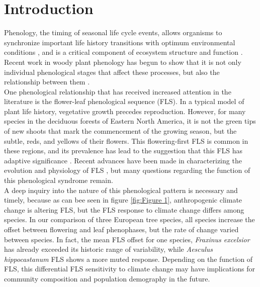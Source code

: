 \documentclass[12pt]{article}\usepackage[]{graphicx}\usepackage[]{color}
\begin{document}
\section*{Introduction}
\indent \indent Phenology, the timing of seasonal life cycle events, allows organisms to synchronize important life history transitions with optimum environmental conditions \citep{Forrest2010}, and is a critical component of ecosystem structure and function \citep{Cleland2007,Piao2007}. Recent work in woody plant phenology has begun to show that it is not only individual phenological stages that affect these processes, but also the relationship between them \citep{Ettinger2018}.\\
\indent One phenological relationship that has received increased attention in the literature is the flower-leaf phenological sequence (FLS). In a typical model of plant life history, vegetative growth precedes reproduction. However, for many species in the deciduous forests of Eastern North America, it is not the green tips of new shoots that mark the commencement of the growing season, but the subtle, reds, and yellows of their flowers. This flowering-first FLS is common in these regions, and its prevalence has lead to the suggestion that this FLS has adaptive significance \citep{Rathcke_1985}. %
Recent advances have been made in characterizing the evolution and physiology of FLS \citep{Gougherty2018,Savage2019}, but many questions regarding the function of this phenological syndrome remain.\\
\indent A deep inquiry into the nature of this phenological pattern is necessary and timely, because as can bee seen in figure \ref{fig:Figure 1}, anthropogenic climate change is altering FLS, but the FLS response to climate change differs among species. In our comparison of three European tree species, all species increase the offset between flowering and leaf phenophases, but the rate of change varied between species. In fact, the mean FLS offset for one species, \textit{Fraxinus excelsior} has already exceeded its historic range of variability, while \textit{Aesculus hippocastanum} FLS shows a more muted response. Depending on the function of FLS, this differential FLS sensitivity to climate change may have implications for community composition and population demography in the future.\\
\end{document}
